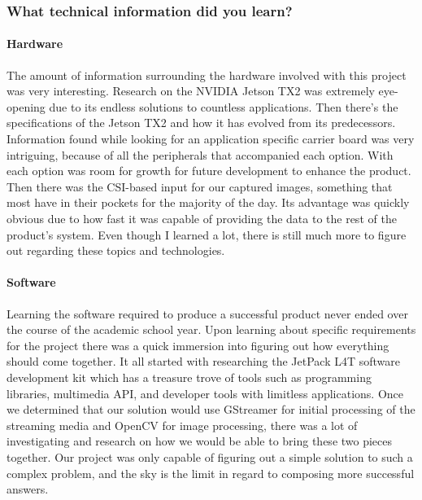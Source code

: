 \subsubsection{What technical information did you learn?}

\paragraph{Hardware}

The amount of information surrounding the hardware involved with this project was very 
interesting. Research on the NVIDIA Jetson TX2 was extremely eye-opening due to its 
endless solutions to countless applications. Then there's the specifications of the 
Jetson TX2 and how it has evolved from its predecessors. Information found while looking 
for an application specific carrier board was very intriguing, because of all the 
peripherals that accompanied each option. With each option was room for growth for 
future development to enhance the product. Then there was the CSI-based input for our 
captured images, something that most have in their pockets for the majority of the day. 
Its advantage was quickly obvious due to how fast it was capable of providing the data 
to the rest of the product's system. Even though I learned a lot, there is still much 
more to figure out regarding these topics and technologies.  \\

\paragraph{Software}

Learning the software required to produce a successful product never ended over the 
course of the academic school year. Upon learning about specific requirements for the 
project there was a quick immersion into figuring out how everything should come together. 
It all started with researching the JetPack L4T software development kit which has a 
treasure trove of tools such as programming libraries, multimedia API, and developer 
tools with limitless applications. Once we determined that our solution would use 
GStreamer for initial processing of the streaming media and OpenCV for image processing, 
there was a lot of investigating and research on how we would be able to bring these 
two pieces together. Our project was only capable of figuring out a simple solution 
to such a complex problem, and the sky is the limit in regard to composing more 
successful answers.  \\

